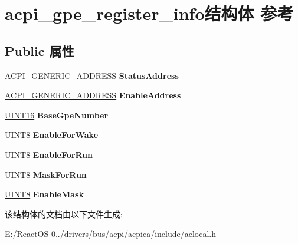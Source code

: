 \hypertarget{structacpi__gpe__register__info}{}\section{acpi\+\_\+gpe\+\_\+register\+\_\+info结构体 参考}
\label{structacpi__gpe__register__info}
\subsection*{Public 属性}
\begin{DoxyCompactItemize}
\item 
\mbox{\label{structacpi__gpe__register__info_acc2392bb8ba38a4a109043c5da9d9c0a}} 
\hyperlink{structacpi__generic__address}{A\+C\+P\+I\+\_\+\+G\+E\+N\+E\+R\+I\+C\+\_\+\+A\+D\+D\+R\+E\+SS} {\bfseries Status\+Address}
\item 
\mbox{\label{structacpi__gpe__register__info_a56ba2abcb78b284a9dd450d597ce2518}} 
\hyperlink{structacpi__generic__address}{A\+C\+P\+I\+\_\+\+G\+E\+N\+E\+R\+I\+C\+\_\+\+A\+D\+D\+R\+E\+SS} {\bfseries Enable\+Address}
\item 
\mbox{\label{structacpi__gpe__register__info_aeaee6524649812a87de4ec2b1a629889}} 
\hyperlink{_processor_bind_8h_a09f1a1fb2293e33483cc8d44aefb1eb1}{U\+I\+N\+T16} {\bfseries Base\+Gpe\+Number}
\item 
\mbox{\label{structacpi__gpe__register__info_add57ccf456865907bdfc6797c3ab287b}} 
\hyperlink{_processor_bind_8h_ab27e9918b538ce9d8ca692479b375b6a}{U\+I\+N\+T8} {\bfseries Enable\+For\+Wake}
\item 
\mbox{\label{structacpi__gpe__register__info_a4709b47a8f4cadd45708d068abc6322a}} 
\hyperlink{_processor_bind_8h_ab27e9918b538ce9d8ca692479b375b6a}{U\+I\+N\+T8} {\bfseries Enable\+For\+Run}
\item 
\mbox{\label{structacpi__gpe__register__info_a1bcf7eec6aa014fbd13719aea04517a1}} 
\hyperlink{_processor_bind_8h_ab27e9918b538ce9d8ca692479b375b6a}{U\+I\+N\+T8} {\bfseries Mask\+For\+Run}
\item 
\mbox{\label{structacpi__gpe__register__info_a9212a950924414bdd7e6717865eedb4e}} 
\hyperlink{_processor_bind_8h_ab27e9918b538ce9d8ca692479b375b6a}{U\+I\+N\+T8} {\bfseries Enable\+Mask}
\end{DoxyCompactItemize}


该结构体的文档由以下文件生成\+:\begin{DoxyCompactItemize}
\item 
E\+:/\+React\+O\+S-\/0../drivers/bus/acpi/acpica/include/aclocal.\+h\end{DoxyCompactItemize}
